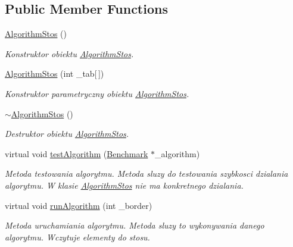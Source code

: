 \subsection*{Public Member Functions}
\begin{DoxyCompactItemize}
\item 
\hyperlink{class_algorithm_stos_a0d987377d7c5d9cea3152680ba437cd3}{Algorithm\-Stos} ()
\begin{DoxyCompactList}\small\item\em Konstruktor obiektu \hyperlink{class_algorithm_stos}{Algorithm\-Stos}. \end{DoxyCompactList}\item 
\hyperlink{class_algorithm_stos_a5dc7ad87d403c67d64aa6cac6a626992}{Algorithm\-Stos} (int \-\_\-tab\mbox{[}$\,$\mbox{]})
\begin{DoxyCompactList}\small\item\em Konstruktor parametryczny obiektu \hyperlink{class_algorithm_stos}{Algorithm\-Stos}. \end{DoxyCompactList}\item 
\hyperlink{class_algorithm_stos_a68a3733d5dfd9fefe38059f0ce0202bf}{$\sim$\-Algorithm\-Stos} ()
\begin{DoxyCompactList}\small\item\em Destruktor obiektu \hyperlink{class_algorithm_stos}{Algorithm\-Stos}. \end{DoxyCompactList}\item 
virtual void \hyperlink{class_algorithm_stos_a7fb987baf970d51f90ad880d27e537a4}{test\-Algorithm} (\hyperlink{class_benchmark}{Benchmark} $\ast$\-\_\-algorithm)
\begin{DoxyCompactList}\small\item\em Metoda testowania algorytmu. Metoda sluzy do testowania szybkosci dzialania algorytmu. W klasie \hyperlink{class_algorithm_stos}{Algorithm\-Stos} nie ma konkretnego dzialania. \end{DoxyCompactList}\item 
virtual void \hyperlink{class_algorithm_stos_a889f7150ae3651b40e5acca7542dbbd1}{run\-Algorithm} (int \-\_\-border)
\begin{DoxyCompactList}\small\item\em Metoda uruchamiania algorytmu. Metoda sluzy to wykonywania danego algorytmu. Wczytuje elementy do stosu. \end{DoxyCompactList}\end{DoxyCompactItemize}
